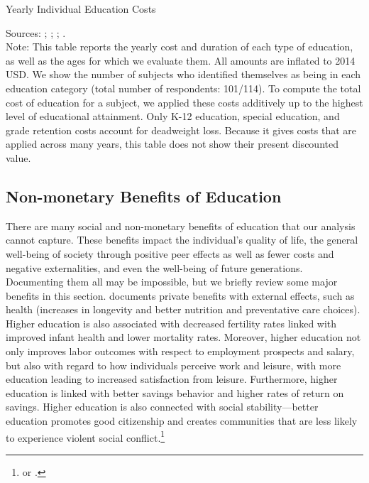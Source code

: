 \begin{table}[H]
\caption{Yearly Individual Education Costs} \label{tab:yearlyedu}
\centering
\begin{adjustbox}{max width=\textwidth}
\begin{threeparttable}
\footnotesize

\centering
\begin{tablenotes}%
\scriptsize
\item Sources: \citet{Snyder_Willow_2012_BOOK_NCES}; \citet{Hoenack_Weiler_1975_JHR}; \cite{Dhanidina_Griffith_1975_AEQ}; \cite{Freeman_1974_Occupational-Training_RES}. \\
 Note: This table reports the yearly cost and duration of each type of education, as well as the ages for which we evaluate them.  All amounts are inflated to 2014 USD.
We show the number of subjects who identified themselves as being in each education category (total number of respondents: 101/114). To compute the total cost of education for a subject, we applied these costs additively up to the highest level of educational attainment. Only K-12 education, special  education, and grade retention costs account for deadweight loss. Because it gives costs that are applied across many years, this table does not show their present discounted value.
\end{tablenotes}
\end{threeparttable}
\end{adjustbox}
\end{table}

\subsection{Non-monetary Benefits of Education}

\noindent There are many social and non-monetary benefits of education that our analysis cannot capture. These benefits impact the individual's quality of life, the general well-being of society through positive peer effects as well as fewer costs and negative externalities, and even the well-being of future generations. Documenting them all may be impossible, but we briefly review some major benefits in this section. \cite{Vila_2000_Non-Monetary-Benefits-Education} documents private benefits with external effects, such as health (increases in longevity and better nutrition and preventative care choices). Higher education is also associated with decreased fertility rates linked with improved infant health and lower mortality rates. Moreover, higher education not only improves labor outcomes with respect to employment prospects and salary, but also with regard to how individuals perceive work and leisure, with more education leading to increased satisfaction from leisure. Furthermore, higher education is linked with better savings behavior and higher rates of return on savings. Higher education is also connected with social stability---better education promotes good citizenship and creates communities that are less likely to experience violent social conflict.\footnote{\citet{Lochner_2011_Handbook} or \citet{Lochner_2011_NBER}.}